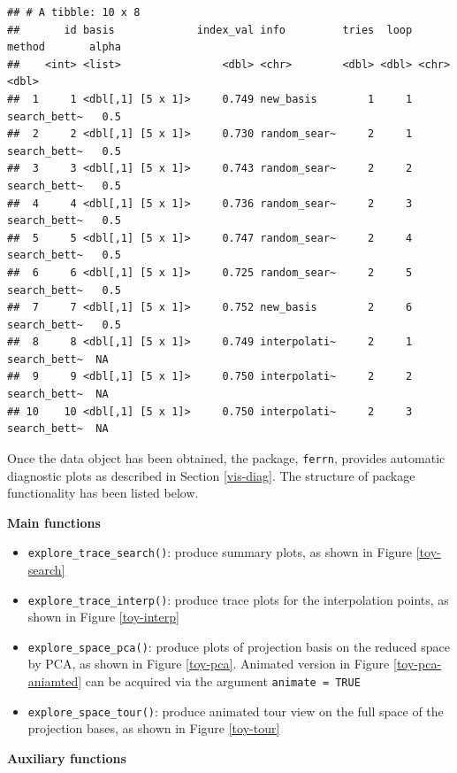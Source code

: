 \documentclass[12pt]{article}
\providecommand{\tightlist}{%
  \setlength{\itemsep}{0pt}\setlength{\parskip}{0pt}}
\begin{document}
\begin{verbatim}
## # A tibble: 10 x 8
##       id basis             index_val info         tries  loop method       alpha
##    <int> <list>                <dbl> <chr>        <dbl> <dbl> <chr>        <dbl>
##  1     1 <dbl[,1] [5 x 1]>     0.749 new_basis        1     1 search_bett~   0.5
##  2     2 <dbl[,1] [5 x 1]>     0.730 random_sear~     2     1 search_bett~   0.5
##  3     3 <dbl[,1] [5 x 1]>     0.743 random_sear~     2     2 search_bett~   0.5
##  4     4 <dbl[,1] [5 x 1]>     0.736 random_sear~     2     3 search_bett~   0.5
##  5     5 <dbl[,1] [5 x 1]>     0.747 random_sear~     2     4 search_bett~   0.5
##  6     6 <dbl[,1] [5 x 1]>     0.725 random_sear~     2     5 search_bett~   0.5
##  7     7 <dbl[,1] [5 x 1]>     0.752 new_basis        2     6 search_bett~   0.5
##  8     8 <dbl[,1] [5 x 1]>     0.749 interpolati~     2     1 search_bett~  NA  
##  9     9 <dbl[,1] [5 x 1]>     0.750 interpolati~     2     2 search_bett~  NA  
## 10    10 <dbl[,1] [5 x 1]>     0.750 interpolati~     2     3 search_bett~  NA
\end{verbatim}

Once the data object has been obtained, the package, \texttt{ferrn}, provides automatic diagnostic plots as described in Section \ref{vis-diag}. The structure of package functionality has been listed below.

\textbf{Main functions}

\begin{itemize}
\tightlist
\item
  \texttt{explore\_trace\_search()}: produce summary plots, as shown in Figure \ref{toy-search}
\item
  \texttt{explore\_trace\_interp()}: produce trace plots for the interpolation points, as shown in Figure \ref{toy-interp}
\item
  \texttt{explore\_space\_pca()}: produce plots of projection basis on the reduced space by PCA, as shown in Figure \ref{toy-pca}. Animated version in Figure \ref{toy-pca-aniamted} can be acquired via the argument \texttt{animate\ =\ TRUE}
\item
  \texttt{explore\_space\_tour()}: produce animated tour view on the full space of the projection bases, as shown in Figure \ref{toy-tour}
\end{itemize}

\textbf{Auxiliary functions}
\end{document}
